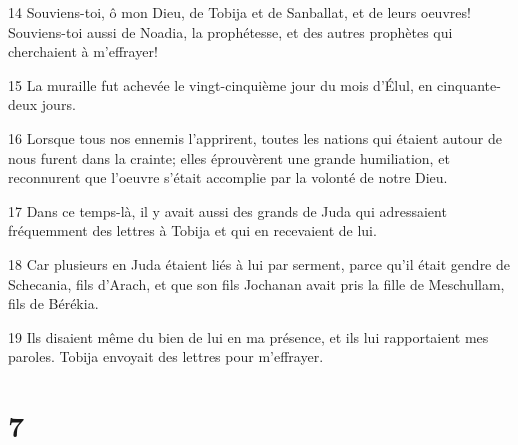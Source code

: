\par 14 Souviens-toi, ô mon Dieu, de Tobija et de Sanballat, et de leurs oeuvres! Souviens-toi aussi de Noadia, la prophétesse, et des autres prophètes qui cherchaient à m'effrayer!
\par 15 La muraille fut achevée le vingt-cinquième jour du mois d'Élul, en cinquante-deux jours.
\par 16 Lorsque tous nos ennemis l'apprirent, toutes les nations qui étaient autour de nous furent dans la crainte; elles éprouvèrent une grande humiliation, et reconnurent que l'oeuvre s'était accomplie par la volonté de notre Dieu.
\par 17 Dans ce temps-là, il y avait aussi des grands de Juda qui adressaient fréquemment des lettres à Tobija et qui en recevaient de lui.
\par 18 Car plusieurs en Juda étaient liés à lui par serment, parce qu'il était gendre de Schecania, fils d'Arach, et que son fils Jochanan avait pris la fille de Meschullam, fils de Bérékia.
\par 19 Ils disaient même du bien de lui en ma présence, et ils lui rapportaient mes paroles. Tobija envoyait des lettres pour m'effrayer.

\chapter{7}

